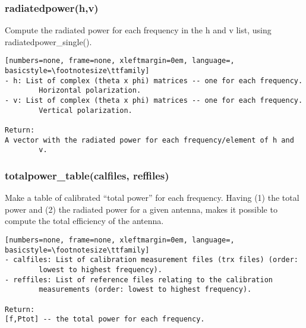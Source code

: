 \subsubsection{radiatedpower(h,v)}
Compute the radiated power for each frequency in the h and v list, using
radiatedpower\_single().

\begin{lstlisting}[numbers=none, frame=none, xleftmargin=0em, language=, basicstyle=\footnotesize\ttfamily]
- h: List of complex (theta x phi) matrices -- one for each frequency.
        Horizontal polarization.
- v: List of complex (theta x phi) matrices -- one for each frequency.
        Vertical polarization.

Return:
A vector with the radiated power for each frequency/element of h and
        v.
\end{lstlisting}

\subsubsection{totalpower\_table(calfiles, reffiles)}
Make a table of calibrated ``total power'' for each frequency.
Having (1) the total power and (2) the radiated power for a given antenna,
makes it possible to compute the total efficiency of the antenna.

\begin{lstlisting}[numbers=none, frame=none, xleftmargin=0em, language=, basicstyle=\footnotesize\ttfamily]
- calfiles: List of calibration measurement files (trx files) (order:
        lowest to highest frequency).
- reffiles: List of reference files relating to the calibration
        measurements (order: lowest to highest frequency).

Return:
[f,Ptot] -- the total power for each frequency.
\end{lstlisting}

